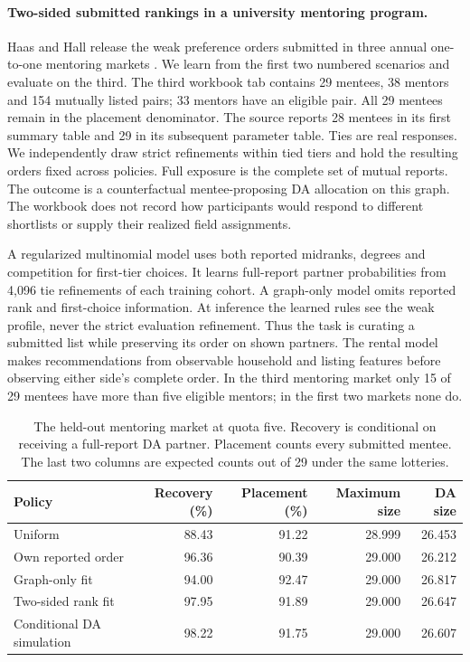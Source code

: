 \paragraph{Two-sided submitted rankings in a university mentoring program.}
Haas and Hall release the weak preference orders submitted in three annual one-to-one mentoring markets \citep{haashall2019}. We learn from the first two numbered scenarios and evaluate on the third. The third workbook tab contains 29 mentees, 38 mentors and 154 mutually listed pairs; 33 mentors have an eligible pair. All 29 mentees remain in the placement denominator. The source reports 28 mentees in its first summary table and 29 in its subsequent parameter table. Ties are real responses. We independently draw strict refinements within tied tiers and hold the resulting orders fixed across policies. Full exposure is the complete set of mutual reports. The outcome is a counterfactual mentee-proposing DA allocation on this graph. The workbook does not record how participants would respond to different shortlists or supply their realized field assignments.

A regularized multinomial model uses both reported midranks, degrees and competition for first-tier choices. It learns full-report partner probabilities from 4,096 tie refinements of each training cohort. A graph-only model omits reported rank and first-choice information. At inference the learned rules see the weak profile, never the strict evaluation refinement. Thus the task is curating a submitted list while preserving its order on shown partners. The rental model makes recommendations from observable household and listing features before observing either side's complete order. In the third mentoring market only 15 of 29 mentees have more than five eligible mentors; in the first two markets none do.

\begin{table}[t]\centering
\caption{The held-out mentoring market at quota five. Recovery is conditional on receiving a full-report DA partner. Placement counts every submitted mentee. The last two columns are expected counts out of 29 under the same lotteries.}
\label{tab:mentor-field}
\begin{tabular}{lrrrr}\toprule
Policy & Recovery (\%) & Placement (\%) & Maximum size & DA size\\ \midrule
Uniform & 88.43 & 91.22 & 28.999 & 26.453\\
Own reported order & 96.36 & 90.39 & 29.000 & 26.212\\
Graph-only fit & 94.00 & 92.47 & 29.000 & 26.817\\
Two-sided rank fit & 97.95 & 91.89 & 29.000 & 26.647\\
Conditional DA simulation & 98.22 & 91.75 & 29.000 & 26.607\\ \bottomrule
\end{tabular}
\end{table}

